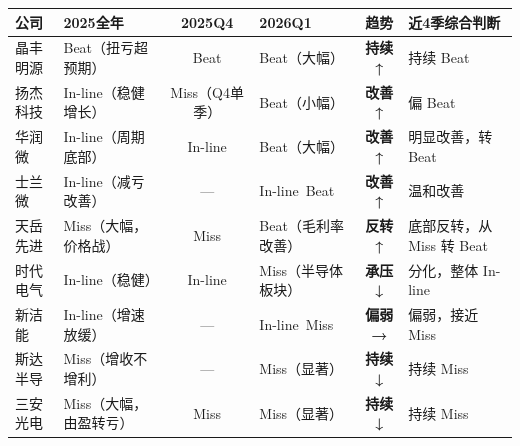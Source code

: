 \begin{exhibitbox}
\centering
\small
\begin{tabularx}{\textwidth}{>{\hsize=0.6\hsize}X >{\hsize=1.0\hsize}X c >{\hsize=1.0\hsize}X c >{\hsize=1.4\hsize}X}
\toprule
\centering\textbf{公司} & \centering\textbf{2025全年} & \textbf{2025Q4} & \centering\textbf{2026Q1} & \textbf{趋势} & \centering\arraybackslash\textbf{近4季综合判断} \\
\midrule
\rowcolor{riskgreen!10}
\centering 晶丰明源 & \centering Beat（扭亏超预期） & Beat & \centering Beat（大幅） & \textcolor{riskgreen}{\textbf{持续↑}} & \centering\arraybackslash 持续 Beat \\
\rowcolor{riskgreen!10}
\centering 扬杰科技 & \centering In-line（稳健增长） & Miss（Q4单季） & \centering Beat（小幅） & \textcolor{riskgreen}{\textbf{改善↑}} & \centering\arraybackslash 偏 Beat \\
\rowcolor{riskamber!10}
\centering 华润微 & \centering In-line（周期底部） & In-line & \centering Beat（大幅） & \textcolor{riskgreen}{\textbf{改善↑}} & \centering\arraybackslash 明显改善，转 Beat \\
\rowcolor{riskamber!10}
\centering 士兰微 & \centering In-line（减亏改善） & — & \centering In-line~Beat & \textcolor{riskgreen}{\textbf{改善↑}} & \centering\arraybackslash 温和改善 \\
\rowcolor{riskamber!10}
\centering 天岳先进 & \centering Miss（大幅，价格战） & Miss & \centering Beat（毛利率改善） & \textcolor{riskgreen}{\textbf{反转↑}} & \centering\arraybackslash 底部反转，从 Miss 转 Beat \\
\rowcolor{riskamber!10}
\centering 时代电气 & \centering In-line（稳健） & In-line & \centering Miss（半导体板块） & \textcolor{riskred}{\textbf{承压↓}} & \centering\arraybackslash 分化，整体 In-line \\
\rowcolor{riskred!10}
\centering 新洁能 & \centering In-line（增速放缓） & — & \centering In-line~Miss & \textcolor{riskred}{\textbf{偏弱→}} & \centering\arraybackslash 偏弱，接近 Miss \\
\rowcolor{riskred!10}
\centering 斯达半导 & \centering Miss（增收不增利） & — & \centering Miss（显著） & \textcolor{riskred}{\textbf{持续↓}} & \centering\arraybackslash 持续 Miss \\
\rowcolor{riskred!10}
\centering 三安光电 & \centering Miss（大幅，由盈转亏） & Miss & \centering Miss（显著） & \textcolor{riskred}{\textbf{持续↓}} & \centering\arraybackslash 持续 Miss \\
\bottomrule
\end{tabularx}
\end{exhibitbox}

